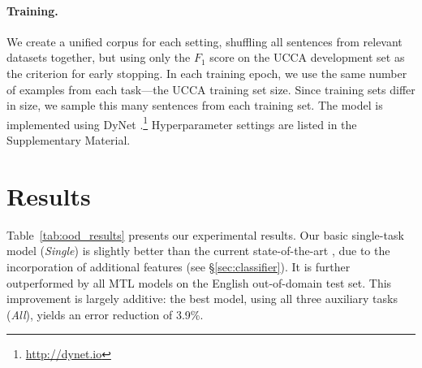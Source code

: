\documentclass[11pt,a4paper]{article}
\newcommand{\oa}[1]{\footnote{\color{red}OA: #1}}
\DeclareMathOperator*{\argmax}{argmax}
\begin{document}
\paragraph{Training.}

We create a unified corpus for each setting, shuffling all sentences from relevant datasets together,
but using only the $F_1$ score on the UCCA development set as the criterion for early stopping.
In each training epoch, we use the same number of examples from each task---the
UCCA training set size.
Since training sets differ in size, we sample this many sentences from each training set.
The model is implemented using DyNet \cite{neubig2017dynet}.\footnote{\url{http://dynet.io}}
Hyperparameter settings are listed in the Supplementary Material.

%
%



\section{Results}\label{sec:results}

Table~\ref{tab:ood_results} presents our experimental results.
Our basic single-task model (\textit{Single})
is slightly better than the current state-of-the-art
\cite[TUPA;][]{hershcovich2017a},
due to the incorporation of additional features (see \S\ref{sec:classifier}).
It is further outperformed by all MTL models
on the English out-of-domain test set.
This improvement is largely additive: the best model, using all three auxiliary tasks (\textit{All}),
yields an error reduction of  3.9\%.
\end{document}
